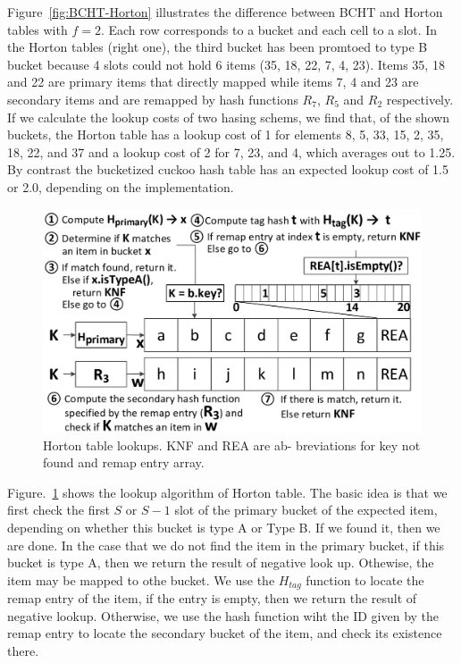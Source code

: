 \documentclass[12pt,conference,compsoc]{IEEEtran}
\begin{document}
Figure~\ref{fig:BCHT-Horton} illustrates the difference between BCHT and Horton tables with $f=2$. Each row corresponds to a bucket and each cell to a slot. In the Horton tables (right one), the third bucket has been promtoed to type B bucket because 4 slots could not hold 6 items (35, 18, 22, 7, 4, 23). Items 35, 18 and 22 are primary items that directly mapped while items 7, 4 and 23 are secondary items and are remapped by hash functions $R_7$, $R_5$ and $R_2$ respectively. If we calculate the lookup costs of two hasing schems, we find that, of the shown buckets, the Horton table has a lookup cost of 1 for elements 8, 5, 33, 15, 2, 35, 18, 22, and 37 and a lookup cost of 2 for 7, 23, and 4, which averages out to 1.25. By contrast the bucketized cuckoo hash table has an expected lookup cost of 1.5 or 2.0, depending on the implementation.

\begin{figure}
    \centering
    \includegraphics[width=\linewidth]{Horton-lookup.png}
    \caption{Horton table lookups. KNF and REA are ab- breviations for key not found and remap entry array.} \label{fig:Horton-lookup}
\end{figure}

Figure.~\ref{fig:Horton-lookup} shows the lookup algorithm of Horton table. The basic idea is that we first check the first $S$ or $S-1$ slot of the primary bucket of the expected item, depending on whether this bucket is type A or Type B. If we found it, then we are done. In the case that we do not find the item in the primary bucket, if this bucket is type A, then we return the result of negative look up. Othewise, the item may be mapped to othe bucket. We use the $H_{tag}$ function to locate the remap entry of the item, if the entry is empty, then we return the result of negative lookup. Otherwise, we use the hash function wiht the ID given by the remap entry to locate the secondary bucket of the item, and check its existence there.
\end{document}
